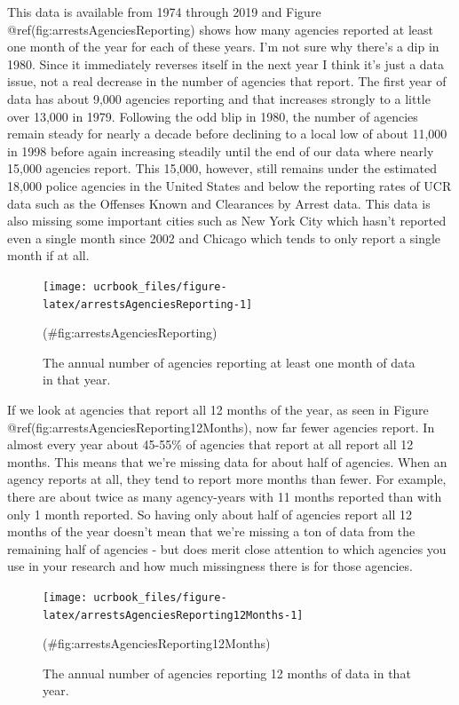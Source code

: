 \documentclass[
  12pt,
  openany]{book}
\begin{document}
This data is available from 1974 through 2019 and Figure @ref(fig:arrestsAgenciesReporting) shows how many agencies reported at least one month of the year for each of these years. I'm not sure why there's a dip in 1980. Since it immediately reverses itself in the next year I think it's just a data issue, not a real decrease in the number of agencies that report. The first year of data has about 9,000 agencies reporting and that increases strongly to a little over 13,000 in 1979. Following the odd blip in 1980, the number of agencies remain steady for nearly a decade before declining to a local low of about 11,000 in 1998 before again increasing steadily until the end of our data where nearly 15,000 agencies report. This 15,000, however, still remains under the estimated 18,000 police agencies in the United States and below the reporting rates of UCR data such as the Offenses Known and Clearances by Arrest data. This data is also missing some important cities such as New York City which hasn't reported even a single month since 2002 and Chicago which tends to only report a single month if at all.

\begin{figure}

{\centering \texttt{[image: ucrbook\_files/figure-latex/arrestsAgenciesReporting-1]} 

}

\caption{The annual number of agencies reporting at least one month of data in that year.}(\#fig:arrestsAgenciesReporting)
\end{figure}

If we look at agencies that report all 12 months of the year, as seen in Figure @ref(fig:arrestsAgenciesReporting12Months), now far fewer agencies report. In almost every year about 45-55\% of agencies that report at all report all 12 months. This means that we're missing data for about half of agencies. When an agency reports at all, they tend to report more months than fewer. For example, there are about twice as many agency-years with 11 months reported than with only 1 month reported. So having only about half of agencies report all 12 months of the year doesn't mean that we're missing a ton of data from the remaining half of agencies - but does merit close attention to which agencies you use in your research and how much missingness there is for those agencies.

\begin{figure}

{\centering \texttt{[image: ucrbook\_files/figure-latex/arrestsAgenciesReporting12Months-1]} 

}

\caption{The annual number of agencies reporting 12 months of data in that year.}(\#fig:arrestsAgenciesReporting12Months)
\end{figure}
\end{document}
